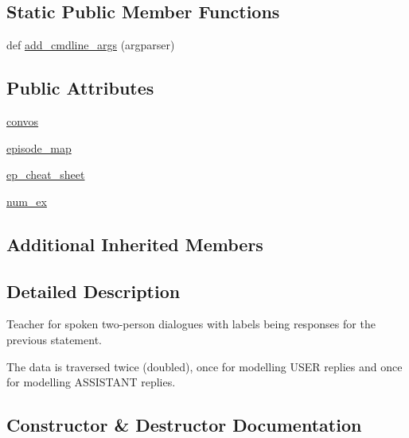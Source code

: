 \subsection*{Static Public Member Functions}
\begin{DoxyCompactItemize}
\item 
def \hyperlink{classparlai_1_1tasks_1_1taskmaster_1_1agents_1_1WozDialogueTeacher_a4af3fe28fd0b7558ddf7ed93c311c722}{add\+\_\+cmdline\+\_\+args} (argparser)
\end{DoxyCompactItemize}
\subsection*{Public Attributes}
\begin{DoxyCompactItemize}
\item 
\hyperlink{classparlai_1_1tasks_1_1taskmaster_1_1agents_1_1WozDialogueTeacher_ae7c9af4478d5e53c4467484838dfd5ba}{convos}
\item 
\hyperlink{classparlai_1_1tasks_1_1taskmaster_1_1agents_1_1WozDialogueTeacher_aa3328a99085735dacfe425013036800f}{episode\+\_\+map}
\item 
\hyperlink{classparlai_1_1tasks_1_1taskmaster_1_1agents_1_1WozDialogueTeacher_a75f5e71661e1d07f68dbfb87ba726400}{ep\+\_\+cheat\+\_\+sheet}
\item 
\hyperlink{classparlai_1_1tasks_1_1taskmaster_1_1agents_1_1WozDialogueTeacher_a27b3ee35b98d89914bc5079d8a6e75aa}{num\+\_\+ex}
\end{DoxyCompactItemize}
\subsection*{Additional Inherited Members}


\subsection{Detailed Description}
\begin{DoxyVerb}Teacher for spoken two-person dialogues with labels being responses for the previous
statement.

The data is traversed twice (doubled), once for modelling USER replies and once for
modelling ASSISTANT replies.
\end{DoxyVerb}
 

\subsection{Constructor \& Destructor Documentation}
\mbox{\label{classparlai_1_1tasks_1_1taskmaster_1_1agents_1_1WozDialogueTeacher_a96c89da471dc6d1983e8c1c509b3be64}} 
